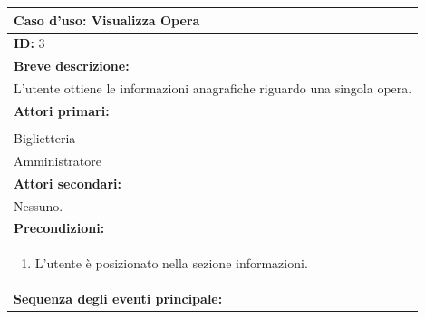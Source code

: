 \documentclass{article}
\begin{document}
                \begin{table}[H]
                    \begin{tabular}{|p{\linewidth}|}
                        \hline
                        \cellcolor{gray!100}
                        \color{white}
                        \centerline{\textbf{Caso d'uso:} Visualizza Opera} \\
                        \hline
                        \textbf{ID:} 3 \\
                        \hline
                        \cellcolor{gray!20}
                        \textbf{Breve descrizione:} \\
                        \cellcolor{gray!20}
                        L'utente ottiene le informazioni anagrafiche riguardo una singola opera. \\
                        \hline
                        \textbf{Attori primari:} \\
                        \begin{minipage}{\linewidth}
                            Cliente \\
                            Biglietteria \\
                            Amministratore
                        \end{minipage}
                        \vspace{0pt} \\  %
                        \hline
                        \textbf{Attori secondari:} \\
                        Nessuno. \\
                        \hline
                        \cellcolor{gray!20}
                        \textbf{Precondizioni:} \\
                        \cellcolor{gray!20}
                        \begin{minipage}{\linewidth}
                            \begin{enumerate}
                                \item L'utente è posizionato nella sezione informazioni.
                            \end{enumerate}
                        \end{minipage} \\
                        \hline
                        \textbf{Sequenza degli eventi principale:}

\end{tabular}
\end{table}
\end{document}
